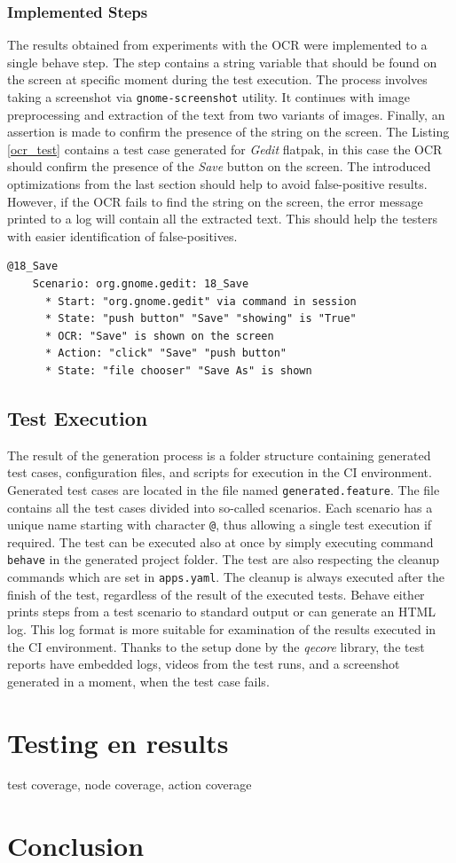 \subsection{Implemented Steps}
The results obtained from experiments with the OCR were implemented to a single behave step. The step contains a string variable that should be found on the screen at specific moment during the test execution. The process involves taking a screenshot via \texttt{gnome-screenshot} utility. It continues with image preprocessing and extraction of the text from two variants of images. Finally, an assertion is made to confirm the presence of the string on the screen. The Listing \ref{ocr_test} contains a test case generated for \textit{Gedit} flatpak, in this case the OCR should confirm the presence of the \textit{Save} button on the screen. The introduced optimizations from the last section should help to avoid false-positive results. However, if the OCR fails to find the string on the screen, the error message printed to a log will contain all the extracted text. This should help the testers with easier identification of false-positives.

\begin{lstlisting}[language=Gherkin,caption={Test case demonstrating the OCR integration in test cases},label={ocr_test}]
    @18_Save
    Scenario: org.gnome.gedit: 18_Save
      * Start: "org.gnome.gedit" via command in session
      * State: "push button" "Save" "showing" is "True"
      * OCR: "Save" is shown on the screen
      * Action: "click" "Save" "push button"
      * State: "file chooser" "Save As" is shown
\end{lstlisting}

\section{Test Execution}
The result of the generation process is a folder structure containing generated test cases, configuration files, and scripts for execution in the CI environment. Generated test cases are located in the file named \texttt{generated.feature}. The file contains all the test cases divided into so-called scenarios. Each scenario has a unique name starting with character \texttt{@}, thus allowing a single test execution if required. The test can be executed also at once by simply executing command \texttt{behave} in the generated project folder. The test are also respecting the cleanup commands which are set in \texttt{apps.yaml}. The cleanup is always executed after the finish of the test, regardless of the result of the executed tests. Behave either prints steps from a test scenario to standard output or can generate an HTML log. This log format is more suitable for examination of the results executed in the CI environment. Thanks to the setup done by the \textit{qecore} library, the test reports have embedded logs, videos from the test runs, and a screenshot generated in a moment, when the test case fails. 


\chapter{Testing en results}
test coverage, node coverage, action coverage




\chapter{Conclusion}
